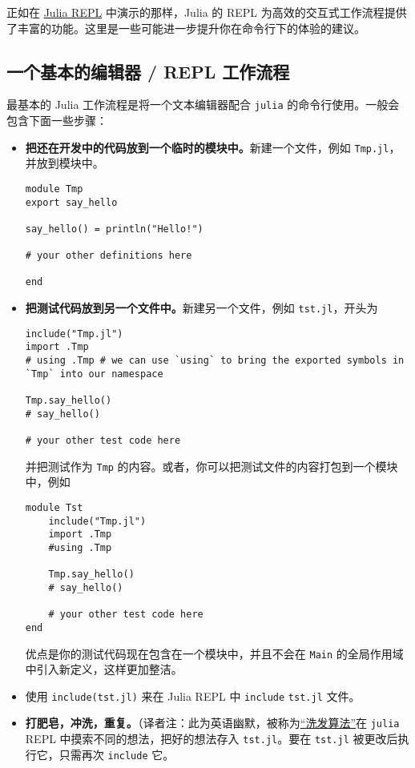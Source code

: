 正如在 \hyperlink{10670790884919535588}{Julia REPL} 中演示的那样，Julia 的 REPL 为高效的交互式工作流程提供了丰富的功能。这里是一些可能进一步提升你在命令行下的体验的建议。



\hypertarget{11122328157249839079}{}


\subsection{一个基本的编辑器 / REPL 工作流程}



最基本的 Julia 工作流程是将一个文本编辑器配合 \texttt{julia} 的命令行使用。一般会包含下面一些步骤：



\begin{itemize}
\item \textbf{把还在开发中的代码放到一个临时的模块中。}新建一个文件，例如 \texttt{Tmp.jl}，并放到模块中。


\begin{verbatim}
module Tmp
export say_hello

say_hello() = println("Hello!")

# your other definitions here

end
\end{verbatim}


\item \textbf{把测试代码放到另一个文件中。}新建另一个文件，例如 \texttt{tst.jl}，开头为


\begin{verbatim}
include("Tmp.jl")
import .Tmp
# using .Tmp # we can use `using` to bring the exported symbols in `Tmp` into our namespace

Tmp.say_hello()
# say_hello()

# your other test code here
\end{verbatim}

并把测试作为 \texttt{Tmp} 的内容。或者，你可以把测试文件的内容打包到一个模块中，例如


\begin{verbatim}
module Tst
    include("Tmp.jl")
    import .Tmp
    #using .Tmp

    Tmp.say_hello()
    # say_hello()

    # your other test code here
end
\end{verbatim}

优点是你的测试代码现在包含在一个模块中，并且不会在 \texttt{Main} 的全局作用域中引入新定义，这样更加整洁。


\item 使用 \texttt{include({\textquotedbl}tst.jl{\textquotedbl})} 来在 Julia REPL 中 \texttt{include} \texttt{tst.jl} 文件。


\item \textbf{打肥皂，冲洗，重复。}（译者注：此为英语幽默，被称为\href{https://en.wikipedia.org/wiki/Lather,\_rinse,\_repeat）描述洗头发的过程}{“洗发算法”}在 \texttt{julia} REPL 中摸索不同的想法，把好的想法存入 \texttt{tst.jl}。要在 \texttt{tst.jl} 被更改后执行它，只需再次 \texttt{include} 它。

\end{itemize}


